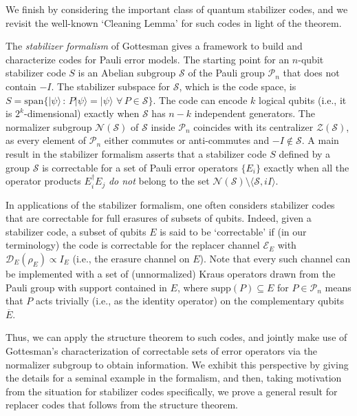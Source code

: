 \documentclass[11pt]{amsart}
\theoremstyle{definition}
\theoremstyle{definition}
\theoremstyle{definition}
\newcommand{\1}{\mathbb{I}}
\def\ket#1{| #1 \rangle}
\begin{document}
We finish by considering the important class of quantum stabilizer codes, and we revisit the well-known `Cleaning Lemma' for such codes in light of the theorem.

The {\it stabilizer formalism} of Gottesman \cite{gottesman1996class,gottesman1997stabilizer} gives a framework to build and characterize codes for Pauli error models. The starting point for an $n$-qubit stabilizer code $S$ is an Abelian subgroup $\mathcal S$ of the Pauli group $\mathcal P_n$ that does not contain $-I$. The stabilizer subspace for $\mathcal S$, which is the code space, is $S = \mathrm{span} \{ \ket{\psi} \, : \, P \ket{\psi} = \ket{\psi} \,\, \forall\, P \in \mathcal S\}$. The code can encode $k$ logical qubits (i.e., it is $2^k$-dimensional) exactly when $\mathcal S$ has $n-k$ independent generators. The normalizer subgroup $\mathcal N(\mathcal S)$ of $\mathcal S$ inside $\mathcal P_n$ coincides with its centralizer $\mathcal Z(\mathcal S)$, as every element of $\mathcal P_n$ either commutes or anti-commutes and $-I \notin \mathcal S$. 
A main result in the stabilizer formalism asserts that a stabilizer code $S$ defined by a group $\mathcal S$ is correctable for a set of Pauli error operators $\{E_i\}$ exactly when all the operator products $E_i^\dagger E_j$ {\it do not} belong to the set $\mathcal N(\mathcal S) \setminus \langle \mathcal S, iI \rangle$. 

In applications of the stabilizer formalism, one often considers stabilizer codes that are correctable for full erasures of subsets of qubits. Indeed, given a stabilizer code, a subset of qubits $E$ is said to be `correctable' if (in our terminology) the code is correctable for the replacer channel $\mathcal E_E$ with $\mathcal D_E(\rho_E) \propto I_E$ (i.e., the erasure channel on $E$).  
Note that every such channel can be implemented with a set of (unnormalized) Kraus operators drawn from the Pauli group with support contained in $E$, where $\mathrm{supp}(P)\subseteq E$ for $P\in \mathcal P_n$ means that $P$ acts trivially (i.e., as the identity operator) on the complementary qubits $\overline{E}$.  

Thus, we can apply the structure theorem to such codes, and jointly make use of Gottesman's characterization of correctable sets of error operators via the normalizer subgroup to obtain information. We exhibit this perspective by giving the details for a seminal example in the formalism, and then, taking motivation from the situation for stabilizer codes specifically, we prove a general result for replacer codes that follows from the structure theorem. 
\end{document}
